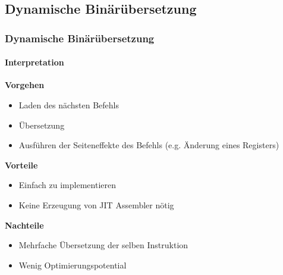 \subsection{Dynamische Binärübersetzung} %
\begin{frame}
    \frametitle{Dynamische Binärübersetzung}
    \framesubtitle{Interpretation}

    \textbf{Vorgehen}
    \begin{itemize}
        \item Laden des nächsten Befehls
        \item Übersetzung
        \item Ausführen der Seiteneffekte des Befehls (e.g. Änderung eines Registers)
    \end{itemize}

    \vspace{0.50cm}

    \textbf{Vorteile}
    \begin{itemize}
        \item Einfach zu implementieren
        \item Keine Erzeugung von JIT Assembler nötig
    \end{itemize}

    \vspace{0.50cm}

    \textbf{Nachteile}
    \begin{itemize}
        \item Mehrfache Übersetzung der selben Instruktion
        \item Wenig Optimierungspotential
    \end{itemize}
\end{frame}


